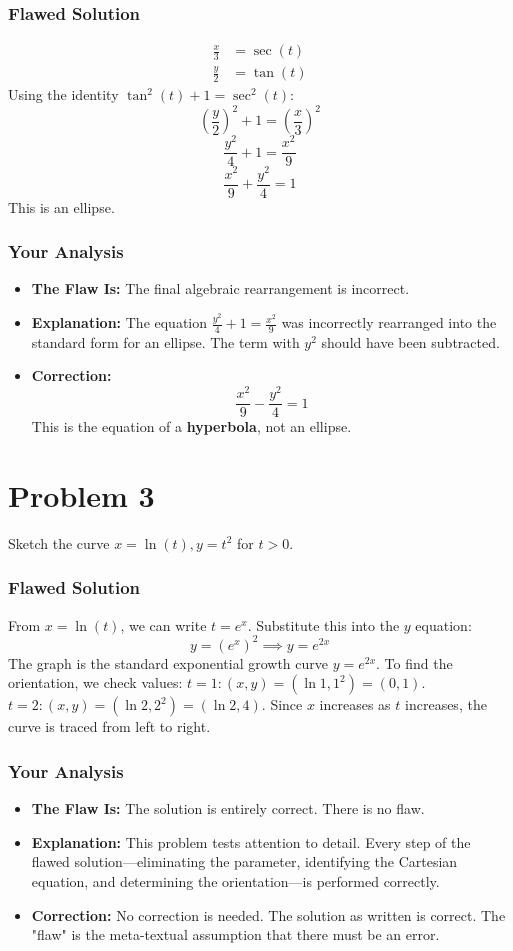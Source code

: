 \documentclass{article}
\begin{document}
\subsubsection*{Flawed Solution}
\begin{align*}
\frac{x}{3} &= \sec(t) \\
\frac{y}{2} &= \tan(t)
\end{align*}
Using the identity $\tan^2(t) + 1 = \sec^2(t)$:
\[ \left(\frac{y}{2}\right)^2 + 1 = \left(\frac{x}{3}\right)^2 \]
\[ \frac{y^2}{4} + 1 = \frac{x^2}{9} \]
\[ \frac{x^2}{9} + \frac{y^2}{4} = 1 \]
This is an ellipse.

\subsubsection*{Your Analysis}
\begin{itemize}
    \item \textbf{The Flaw Is:} The final algebraic rearrangement is incorrect.
    \item \textbf{Explanation:} The equation $\frac{y^2}{4} + 1 = \frac{x^2}{9}$ was incorrectly rearranged into the standard form for an ellipse. The term with $y^2$ should have been subtracted.
    \item \textbf{Correction:}
    \[ \frac{x^2}{9} - \frac{y^2}{4} = 1 \]
    This is the equation of a \textbf{hyperbola}, not an ellipse.
\end{itemize}

\section{Problem 3}
Sketch the curve $x = \ln(t), y = t^2$ for $t > 0$.

\subsubsection*{Flawed Solution}
From $x = \ln(t)$, we can write $t = e^x$.
Substitute this into the $y$ equation:
\[ y = (e^x)^2 \implies y = e^{2x} \]
The graph is the standard exponential growth curve $y=e^{2x}$.
To find the orientation, we check values:
$t=1: (x,y) = (\ln 1, 1^2) = (0, 1)$.
$t=2: (x,y) = (\ln 2, 2^2) = (\ln 2, 4)$.
Since $x$ increases as $t$ increases, the curve is traced from left to right.

\subsubsection*{Your Analysis}
\begin{itemize}
    \item \textbf{The Flaw Is:} The solution is entirely correct. There is no flaw.
    \item \textbf{Explanation:} This problem tests attention to detail. Every step of the flawed solution—eliminating the parameter, identifying the Cartesian equation, and determining the orientation—is performed correctly.
    \item \textbf{Correction:} No correction is needed. The solution as written is correct. The "flaw" is the meta-textual assumption that there must be an error.
\end{itemize}
\end{document}
